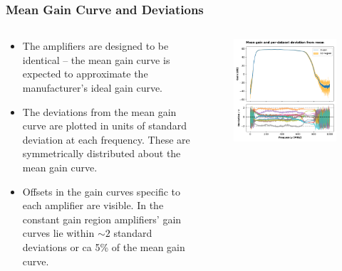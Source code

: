 \documentclass[9pt, aspectratio=169]{beamer}
\begin{document}
\begin{frame}
	\frametitle{Mean Gain Curve and Deviations}

	\begin{columns}
		\begin{column}{.45\textwidth}
			\begin{itemize}
				\item The amplifiers are designed to be identical -- the mean gain curve is expected to approximate the manufacturer's ideal gain curve.
				\item The deviations from the mean gain curve are plotted in units of standard deviation at each frequency. These are symmetrically distributed about the mean gain curve.
				\item Offsets in the gain curves specific to each amplifier are visible. In the constant gain region amplifiers' gain curves lie within $\sim 2$ standard deviations or ca 5\% of the mean gain curve.
			\end{itemize}
		\end{column}

		\begin{column}{.55\textwidth}
			\begin{figure}[H]
				\centering
				\includegraphics[width=1.0\linewidth]{../mean_and_deviation}
				\label{fig:meananddeviation}
			\end{figure}
		\end{column}
	\end{columns}


\end{frame}
\end{document}
